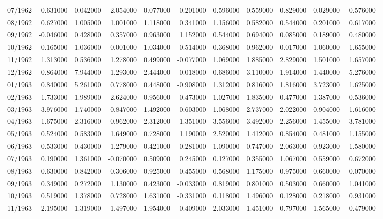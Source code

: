 \begin{tabular}{lrrrrrrrrrr}
07/1962 & 0.631000 & 0.042000 & 2.054000 & 0.077000 & 0.201000 & 0.596000 & 0.559000 & 0.829000 & 0.029000 & 0.576000 \\
08/1962 & 0.627000 & 1.005000 & 1.001000 & 1.118000 & 0.341000 & 1.156000 & 0.582000 & 0.544000 & 0.201000 & 0.617000 \\
09/1962 & -0.046000 & 0.428000 & 0.357000 & 0.963000 & 1.152000 & 0.544000 & 0.694000 & 0.085000 & 0.189000 & 0.480000 \\
10/1962 & 0.165000 & 1.036000 & 0.001000 & 1.034000 & 0.514000 & 0.368000 & 0.962000 & 0.017000 & 1.060000 & 1.655000 \\
11/1962 & 1.313000 & 0.536000 & 1.278000 & 0.499000 & -0.077000 & 1.069000 & 1.885000 & 2.829000 & 1.501000 & 1.657000 \\
12/1962 & 0.864000 & 7.944000 & 1.293000 & 2.444000 & 0.018000 & 0.686000 & 3.110000 & 1.914000 & 1.440000 & 5.276000 \\
01/1963 & 0.840000 & 5.261000 & 0.778000 & 0.448000 & -0.908000 & 1.312000 & 0.816000 & 1.816000 & 3.723000 & 1.625000 \\
02/1963 & 1.733000 & 1.989000 & 2.624000 & 0.956000 & 0.473000 & 1.027000 & 1.835000 & 0.477000 & 1.387000 & 0.536000 \\
03/1963 & 3.976000 & 1.740000 & 0.847000 & 1.492000 & 0.603000 & 1.068000 & 2.737000 & 2.022000 & 0.904000 & 1.616000 \\
04/1963 & 1.675000 & 2.316000 & 0.962000 & 2.312000 & 1.351000 & 3.556000 & 3.492000 & 2.256000 & 1.455000 & 3.781000 \\
05/1963 & 0.524000 & 0.583000 & 1.649000 & 0.728000 & 1.190000 & 2.520000 & 1.412000 & 0.854000 & 0.481000 & 1.155000 \\
06/1963 & 0.533000 & 0.430000 & 1.279000 & 0.421000 & 0.281000 & 1.090000 & 0.747000 & 2.063000 & 0.923000 & 1.580000 \\
07/1963 & 0.190000 & 1.361000 & -0.070000 & 0.509000 & 0.245000 & 0.127000 & 0.355000 & 1.067000 & 0.559000 & 0.672000 \\
08/1963 & 0.630000 & 0.842000 & 0.306000 & 0.925000 & 0.455000 & 0.568000 & 1.175000 & 0.975000 & 0.660000 & -0.070000 \\
09/1963 & 0.349000 & 0.272000 & 1.130000 & 0.423000 & -0.033000 & 0.819000 & 0.801000 & 0.503000 & 0.660000 & 1.041000 \\
10/1963 & 0.519000 & 1.378000 & 0.728000 & 1.631000 & -0.331000 & 0.118000 & 1.496000 & 0.128000 & 0.218000 & 0.931000 \\
11/1963 & 2.195000 & 1.319000 & 1.497000 & 1.954000 & -0.409000 & 2.033000 & 1.451000 & 0.797000 & 1.565000 & 0.479000 \\

\end{tabular}
